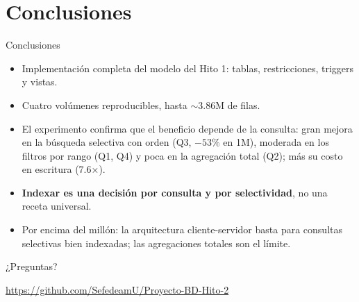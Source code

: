 \documentclass[10pt,aspectratio=169]{beamer}
\begin{document}
\section{Conclusiones}
\begin{frame}{Conclusiones}
\begin{itemize}
  \item Implementación completa del modelo del Hito 1: tablas, restricciones, triggers y vistas.
  \item Cuatro volúmenes reproducibles, hasta $\sim$3.86M de filas.
  \item El experimento confirma que el beneficio depende de la consulta: gran mejora en la búsqueda selectiva con orden (Q3, $-53\%$ en 1M), moderada en los filtros por rango (Q1, Q4) y poca en la agregación total (Q2); más su costo en escritura (7.6×).
  \item \textbf{Indexar es una decisión por consulta y por selectividad}, no una receta universal.
  \item Por encima del millón: la arquitectura cliente-servidor basta para consultas selectivas bien indexadas; las agregaciones totales son el límite.
\end{itemize}
\end{frame}

\begin{frame}
\centering
\Large ¿Preguntas?
\vspace{0.5cm}

\footnotesize \url{https://github.com/SefedeamU/Proyecto-BD-Hito-2}
\end{frame}
\end{document}
